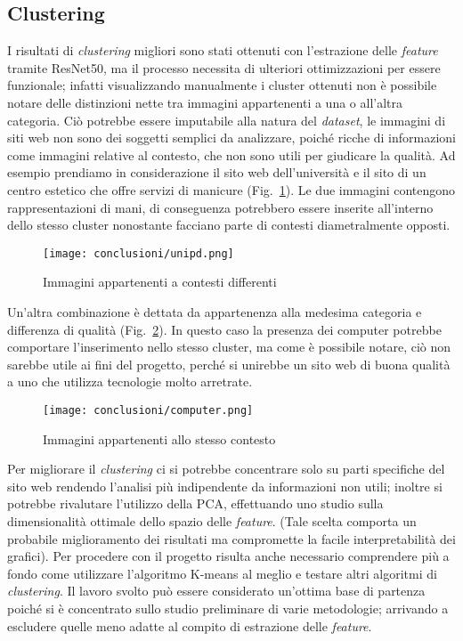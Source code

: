 \newpage 

\subsection{Clustering}
I risultati di \emph{clustering} migliori sono stati ottenuti con l'estrazione delle \emph{\gls{feature}} tramite ResNet50, ma il processo necessita di ulteriori ottimizzazioni per essere funzionale;
infatti visualizzando manualmente i cluster ottenuti non è possibile notare delle distinzioni nette tra immagini appartenenti a una o all'altra categoria. Ciò potrebbe essere imputabile alla natura del \emph{\gls{dataset}}, le immagini di siti web non sono dei soggetti semplici da analizzare, poiché ricche di informazioni come immagini relative al contesto, che non sono utili per giudicare la qualità.
Ad esempio prendiamo in considerazione il sito web dell'università e il sito di un centro estetico che offre servizi di manicure (Fig.~\ref{fig:unipd-conc}).
Le due immagini contengono rappresentazioni di mani, di conseguenza potrebbero essere inserite all'interno dello stesso cluster nonostante facciano parte di contesti diametralmente opposti.
\begin{figure}[!h] 
    \centering 
    \texttt{[image: conclusioni/unipd.png]} 
    \caption{Immagini appartenenti a contesti differenti}
    \label{fig:unipd-conc}
  \end{figure}

\newpage
Un'altra combinazione è dettata da appartenenza alla medesima categoria e differenza di qualità (Fig.~\ref{fig:computer-conc}).
In questo caso la presenza dei computer potrebbe comportare l'inserimento nello stesso cluster, ma come è possibile notare, ciò non sarebbe utile ai fini del progetto, perché si unirebbe un sito web di buona qualità a uno che utilizza tecnologie molto arretrate.

\begin{figure}[!h] 
    \centering 
    \texttt{[image: conclusioni/computer.png]} 
    \caption{Immagini appartenenti allo stesso contesto}
    \label{fig:computer-conc}
  \end{figure}

Per migliorare il \emph{clustering} ci si potrebbe concentrare solo su parti specifiche del sito web rendendo l'analisi più indipendente da informazioni non utili; inoltre si potrebbe rivalutare l'utilizzo della PCA, effettuando uno studio sulla dimensionalità ottimale dello spazio delle \emph{\gls{feature}}. (Tale scelta comporta un probabile miglioramento dei risultati ma compromette la facile interpretabilità dei grafici).
Per procedere con il progetto risulta anche necessario comprendere più a fondo come utilizzare l'algoritmo K-means al meglio e testare altri algoritmi di \emph{clustering}.
Il lavoro svolto può essere considerato un'ottima base di partenza poiché si è concentrato sullo studio preliminare di varie metodologie; arrivando a escludere quelle meno adatte al compito di estrazione delle \emph{\gls{feature}}.

